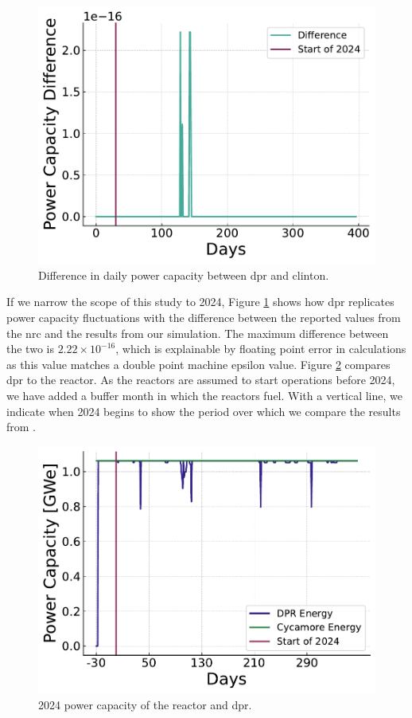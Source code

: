 \begin{figure}[H]
  \centering
  \includegraphics[width=0.7\linewidth]{images/power_reactor/dpr_diff.pdf}
  \caption{Difference in daily power capacity between \gls{dpr} and \gls{clinton}.}
  \label{fig:dpr_clinton_diff}
\end{figure}


If we narrow the scope of this study to 2024, Figure \ref{fig:dpr_clinton_diff}
shows how \gls{dpr} replicates power capacity fluctuations with the
difference between the reported values from the \gls{nrc} \cite{nrc_power_2025}
and the results from our \cyclus simulation. The maximum difference between the
two is $2.22 \times 10^{-16}$, which is explainable by floating point error in
calculations as this value matches a double point machine epsilon value. Figure
\ref{fig:dpr_cycamore_power} compares \gls{dpr} to the \cycamore reactor. As
the reactors are assumed to start operations before 2024, we have added a
buffer month in which the reactors fuel. With a vertical line, we indicate
when 2024 begins to show the period over which we compare the results from
\cyclus.


\begin{figure}[H]
  \centering
  \includegraphics[width=0.7\linewidth]{images/power_reactor/dpr_cycamore_energy.pdf}
  \caption{2024 power capacity of the \cycamore reactor and \gls{dpr}.}
  \label{fig:dpr_cycamore_power}
\end{figure}


